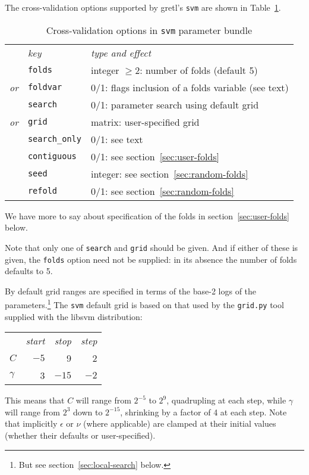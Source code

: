 \documentclass{article}
\begin{document}
The cross-validation options supported by gretl's \texttt{svm} are
shown in Table~\ref{tab:xvalid}.

\begin{table}[htbp]
  \centering
  \begin{tabular}{lll}
  & \textit{key} & \textit{type and effect} \\[2pt]
   & \texttt{folds} & integer $\geq 2$: number of folds (default 5) \\
  \textit{or} & \texttt{foldvar} & 0/1: flags inclusion of a folds variable
    (see text) \\[2pt]
   & \texttt{search} & 0/1: parameter search using default grid \\
 \textit{or} & \texttt{grid} & matrix: user-specified grid \\[2pt]
    & \texttt{search\_only} & 0/1: see text \\
    & \texttt{contiguous} & 0/1: see section~\ref{sec:user-folds} \\
    & \texttt{seed} & integer: see section~\ref{sec:random-folds} \\
    & \texttt{refold} & 0/1: see section~\ref{sec:random-folds}
  \end{tabular}
  \caption{Cross-validation options in \texttt{svm} parameter bundle}
  \label{tab:xvalid}
\end{table}

We have more to say about specification of the folds in
section~\ref{sec:user-folds} below.

Note that only one of \texttt{search} and \texttt{grid} should be
given. And if either of these is given, the \texttt{folds} option
need not be supplied: in its absence the number of folds defaults to
5.

By default grid ranges are specified in terms of the base-2 logs of
the parameters.\footnote{But see section~\ref{sec:local-search}
  below.}  The \texttt{svm} default grid is based on that used by the
\texttt{grid.py} tool supplied with the \textsf{libsvm} distribution:
\begin{center}
\begin{tabular}{lrrr}
 & \textit{start} & \textit{stop} & \textit{step} \\[2pt]
$C$ & $-5$ & 9 & 2 \\
$\gamma$ & 3 & $-15$ & $-2$ 
\end{tabular}
\end{center}

This means that $C$ will range from $2^{-5}$ to $2^9$, quadrupling at
each step, while $\gamma$ will range from $2^3$ down to $2^{-15}$,
shrinking by a factor of 4 at each step. Note that implicitly
$\epsilon$ or $\nu$ (where applicable) are clamped at their initial
values (whether their defaults or user-specified).
\end{document}
